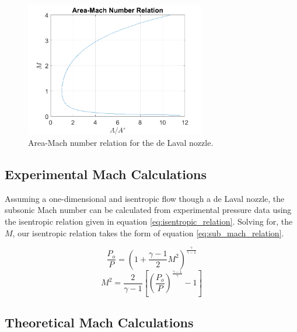 \documentclass[runningheads]{llncs}
\begin{document}
\begin{figure}
    \centering
    \includegraphics[width=0.7\textwidth]{figures/area_mach_relation.png}
    \caption{Area-Mach number relation for the de Laval nozzle.}
    \label{fig:AM_relation}
\end{figure}

\subsection{Experimental Mach Calculations}

Assuming a one-dimensional and isentropic flow though a de Laval nozzle, the subsonic Mach number can be calculated from experimental pressure data using the isentropic relation given in equation \ref{eq:isentropic_relation}. Solving for, the $M$, our isentropic relation takes the form of equation \ref{eq:sub_mach_relation}.

\begin{multicols}{2}
\begin{equation}
    \frac{P_o}{P} = \left(1 + \frac{\gamma - 1}{2}M^2\right)^\frac{\gamma}{\gamma - 1}
    \label{eq:isentropic_relation}
\end{equation}
\begin{equation}
    M^2 = \frac{2}{\gamma - 1}\left[\left(\frac{P_o}{P}\right)^\frac{\gamma - 1}{\gamma} - 1\right]
    \label{eq:sub_mach_relation}
\end{equation}
\end{multicols}

\subsection{Theoretical Mach Calculations}


\end{document}
